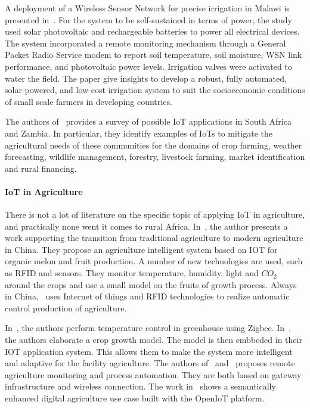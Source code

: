 \documentclass[10pt, conference, compsocconf]{IEEEtran}
\newcommand {\0} {\mathbf 0}
\newcommand {\1} {\mathbf 1}
\begin{document}
A deployment of a Wireless Sensor Network for precise irrigation in Malawi is presented in~\cite{Mafuta2013}.
For the system to be self-sustained in terms of power, the study used solar photovoltaic and rechargeable batteries to power all electrical devices.
The system incorporated a remote monitoring mechanism through a General Packet Radio Service modem to report soil temperature, soil moisture, WSN
link performance, and photovoltaic power levels. 
Irrigation valves were activated to water the field.
The paper give insights to develop a robust, fully automated, solar-powered, and low-cost irrigation system to suit the socioeconomic conditions of small scale farmers in developing countries.

The authors of~\cite{Dlodlo2015} provides a survey of possible IoT applications in South Africa and Zambia.
In particular, they identify examples of IoTs to mitigate the agricultural needs of these communities for the domains of crop farming, weather forecasting, wildlife management, forestry, livestock farming, market identification and rural financing.


\paragraph{IoT in Agriculture}
There is not a lot of literature on the specific topic of applying IoT in agriculture, and practically none went it comes to rural Africa.
In~\cite{Bing2012}, the author presents a work supporting the transition from traditional agriculture to modern agriculture in China.
They propose an agriculture intelligent system based on IOT for organic melon and fruit production. 
A number of new technologies are used, such as RFID and sensors.
They monitor temperature, humidity, light and $CO_2$ around the crops and use a small model on the fruits of growth process.
Always in China,~\cite{TongKe2013} uses Internet of things and RFID technologies to realize automatic control production of agriculture.

In~\cite{Dan2015}, the authors perform temperature control in greenhouse using Zigbee.
In~\cite{Hu2011a}, the authors elaborate a crop growth model.
The model is then embbeded in their IOT application system.
This allows them to make the system more intelligent and adaptive for the facility agriculture.
The authors of~\cite{Nakutis2015} and~\cite{Sarkar2016} proposes remote agriculture monitoring and process automation.
They are both based on gateway infrastructure and wireless connection.
The work in~\cite{Jayaraman2015} shows a semantically enhanced digital agriculture use case built with the OpenIoT platform.
\end{document}
